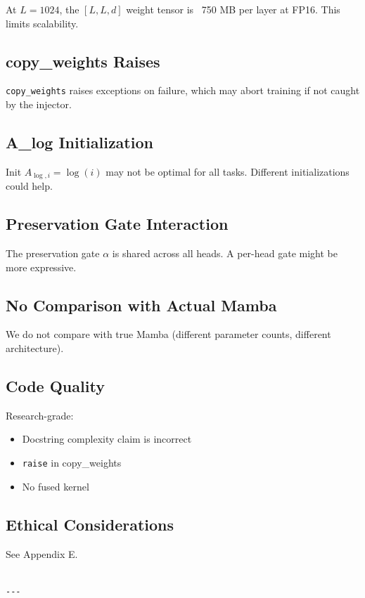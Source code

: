 At $L = 1024$, the $[L, L, d]$ weight tensor is ~750 MB per layer at FP16. 
This limits scalability.

\subsection{copy\_weights Raises}

\texttt{copy\_weights} raises exceptions on failure, which may abort training if 
not caught by the injector.

\subsection{A\_log Initialization}

Init $A_{\log, i} = \log(i)$ may not be optimal for all tasks. Different 
initializations could help.

\subsection{Preservation Gate Interaction}

The preservation gate $\alpha$ is shared across all heads. A per-head gate 
might be more expressive.

\subsection{No Comparison with Actual Mamba}

We do not compare with true Mamba (different parameter counts, different 
architecture).

\subsection{Code Quality}

Research-grade:
\begin{itemize}
\item Docstring complexity claim is incorrect
\item \texttt{raise} in copy\_weights
\item No fused kernel

\end{itemize}
\subsection{Ethical Considerations}

See Appendix E.
\begin{lstlisting}

---
\end{lstlisting}

